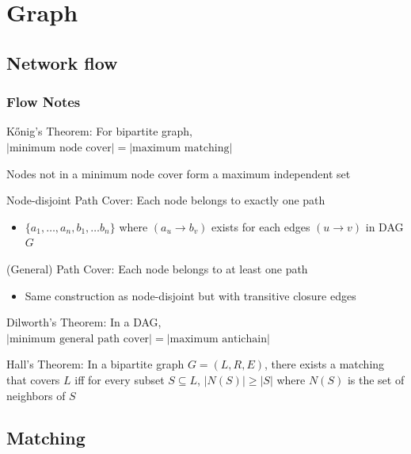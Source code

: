 \chapter{Graph}

\section{Network flow}

\subsection{Flow Notes}
    K\H{o}nig's Theorem: For bipartite graph, $|\text{minimum node cover}| = |\text{maximum matching}|$

    Nodes not in a minimum node cover form a maximum independent set

    Node-disjoint Path Cover: Each node belongs to exactly one path
    \begin{itemize}
     \setlength\itemsep{-1em}
     \item $\{a_1, \dots, a_n, b_1, \dots b_n\}$ where $(a_u \to b_v)$ exists for each edges $(u \to v)$ in DAG $G$
    \end{itemize}

    (General) Path Cover: Each node belongs to at least one path
    \begin{itemize}
     \setlength\itemsep{-1em}
     \item Same construction as node-disjoint but with transitive closure edges
    \end{itemize}

    Dilworth's Theorem: In a DAG, $|\text{minimum general path cover}| = |\text{maximum antichain}|$

	Hall's Theorem: In a bipartite graph $G = (L, R, E)$, there exists a matching that covers $L$ iff for every subset $S \subseteq L$, $|N(S)| \geq |S|$ where $N(S)$ is the set of neighbors of $S$

\section{Matching}

